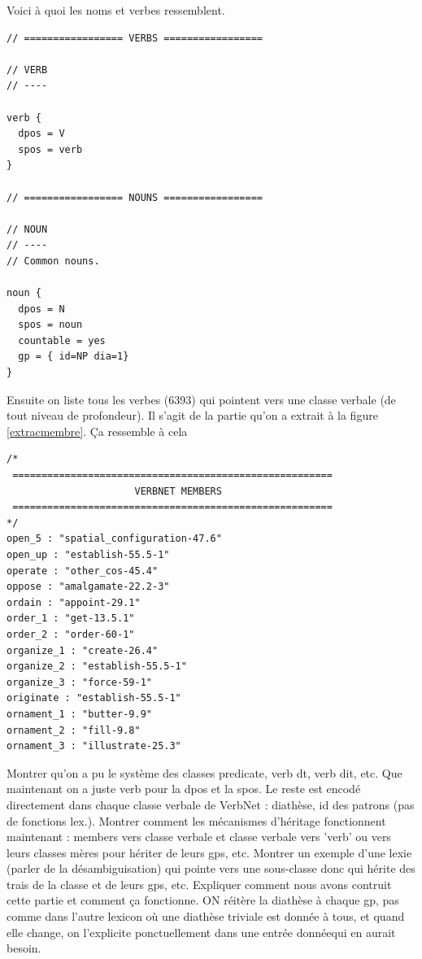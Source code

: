 Voici à quoi les noms et verbes ressemblent.
\begin{lstlisting}[language=XML, caption = Attributs par défaut des classes]
// ================= VERBS =================

// VERB
// ----

verb {
  dpos = V
  spos = verb
}

// ================= NOUNS =================

// NOUN
// ----
// Common nouns.

noun {
  dpos = N
  spos = noun
  countable = yes
  gp = { id=NP dia=1}
}
\end{lstlisting}

Ensuite on liste tous les verbes (6393) qui pointent vers une classe verbale (de tout niveau de profondeur). Il s'agit de la partie qu'on a extrait à la figure \ref{extracmembre}.
Ça ressemble à cela

\begin{lstlisting}[language=XML, caption = Partie membre du lexicon]
/*
 =======================================================
                      VERBNET MEMBERS
 =======================================================
*/
open_5 : "spatial_configuration-47.6"
open_up : "establish-55.5-1"
operate : "other_cos-45.4"
oppose : "amalgamate-22.2-3"
ordain : "appoint-29.1"
order_1 : "get-13.5.1"
order_2 : "order-60-1"
organize_1 : "create-26.4"
organize_2 : "establish-55.5-1"
organize_3 : "force-59-1"
originate : "establish-55.5-1"
ornament_1 : "butter-9.9"
ornament_2 : "fill-9.8"
ornament_3 : "illustrate-25.3"
\end{lstlisting}

Montrer qu'on a pu le système des classes predicate, verb dt, verb dit, etc. Que maintenant on a juste verb pour la dpos et la spos. Le reste est encodé directement dans chaque classe verbale de VerbNet : diathèse, id des patrons (pas de fonctions lex.). Montrer comment les mécanismes d'héritage fonctionnent maintenant : members vers classe verbale et classe verbale vers 'verb' ou vers leurs classes mères pour hériter de leurs gps, etc. Montrer un exemple d'une lexie (parler de la désambiguisation) qui pointe vers une sous-classe donc qui hérite des trais de la classe et de leurs gps, etc. Expliquer comment nous avons contruit cette partie et comment ça fonctionne. ON réitère la diathèse à chaque gp, pas comme dans l'autre lexicon où une diathèse triviale est donnée à tous, et quand elle change, on l'explicite ponctuellement dans une entrée donnéequi en aurait besoin.

